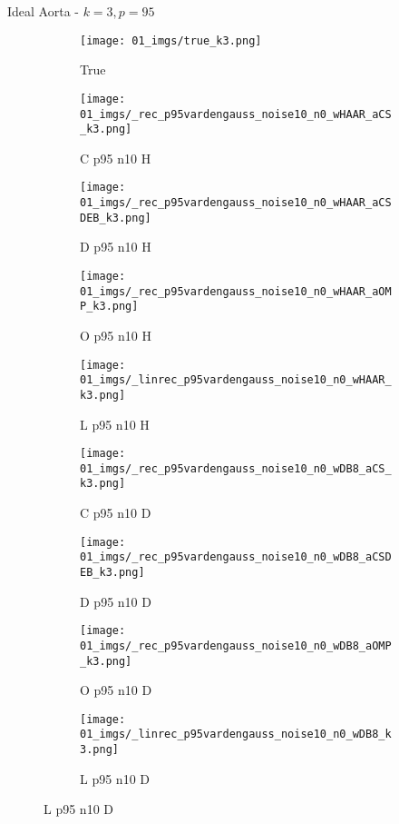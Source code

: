 \begin{frame}{Ideal Aorta - $k=3,p=95$}{}
\begin{figure}
\begin{subfigure}{0.1\textwidth}
\texttt{[image: 01\_imgs/true\_k3.png]}
\caption*{\Tiny True}
\end{subfigure}
\begin{subfigure}{0.1\textwidth}
\texttt{[image: 01\_imgs/\_rec\_p95vardengauss\_noise10\_n0\_wHAAR\_aCS\_k3.png]}
\caption*{\Tiny C p95 n10 H}
\end{subfigure}
\begin{subfigure}{0.1\textwidth}
\texttt{[image: 01\_imgs/\_rec\_p95vardengauss\_noise10\_n0\_wHAAR\_aCSDEB\_k3.png]}
\caption*{\Tiny D p95 n10 H}
\end{subfigure}
\begin{subfigure}{0.1\textwidth}
\texttt{[image: 01\_imgs/\_rec\_p95vardengauss\_noise10\_n0\_wHAAR\_aOMP\_k3.png]}
\caption*{\Tiny O p95 n10 H}
\end{subfigure}
\begin{subfigure}{0.1\textwidth}
\texttt{[image: 01\_imgs/\_linrec\_p95vardengauss\_noise10\_n0\_wHAAR\_k3.png]}
\caption*{\Tiny L p95 n10 H}
\end{subfigure}
\begin{subfigure}{0.1\textwidth}
\texttt{[image: 01\_imgs/\_rec\_p95vardengauss\_noise10\_n0\_wDB8\_aCS\_k3.png]}
\caption*{\Tiny C p95 n10 D}
\end{subfigure}
\begin{subfigure}{0.1\textwidth}
\texttt{[image: 01\_imgs/\_rec\_p95vardengauss\_noise10\_n0\_wDB8\_aCSDEB\_k3.png]}
\caption*{\Tiny D p95 n10 D}
\end{subfigure}
\begin{subfigure}{0.1\textwidth}
\texttt{[image: 01\_imgs/\_rec\_p95vardengauss\_noise10\_n0\_wDB8\_aOMP\_k3.png]}
\caption*{\Tiny O p95 n10 D}
\end{subfigure}
\begin{subfigure}{0.1\textwidth}
\texttt{[image: 01\_imgs/\_linrec\_p95vardengauss\_noise10\_n0\_wDB8\_k3.png]}
\caption*{\Tiny L p95 n10 D}
\end{subfigure}

\vspace{5pt}


\end{figure}
\end{frame}

